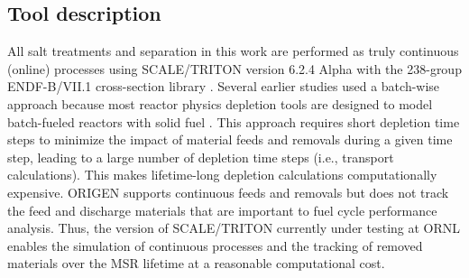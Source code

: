\documentclass{anstrans}
\begin{document}
\subsection{Tool description} 
All salt treatments and separation in this work are performed as truly continuous (online) processes using SCALE/TRITON version 6.2.4 Alpha \cite{betzler_molten_2017-1} with the 238-group ENDF-B/VII.1 cross-section library \cite{rearden_scale_2016}. Several earlier studies used a batch-wise approach because most reactor physics depletion tools are designed to model batch-fueled reactors with solid fuel \cite{betzler_molten_2017, rykhlevskii_online_2017}. This approach requires short depletion time steps to minimize the impact of material feeds and removals during a given time step, leading to a large number of depletion time steps (i.e., transport calculations). This makes lifetime-long depletion calculations computationally expensive. ORIGEN \cite{gauld_isotopic_2011} supports continuous feeds and removals but does not track the feed and discharge materials that are important to fuel cycle performance analysis. Thus, the version of SCALE/TRITON currently under testing at \gls{ORNL} enables the simulation of continuous processes and the tracking of removed materials over the \gls{MSR} lifetime at a reasonable computational cost.
\end{document}
